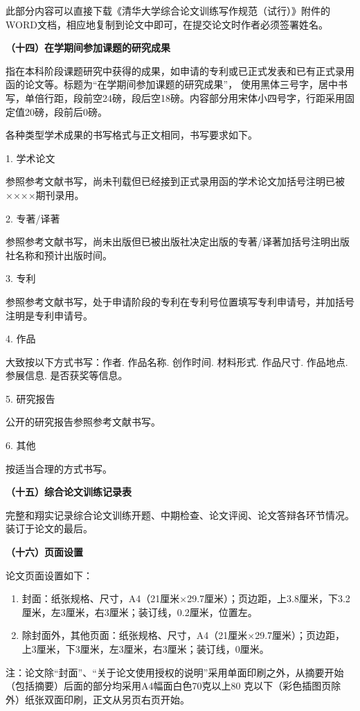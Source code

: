 \documentclass{Diploma}
\begin{document}
\begin{}
此部分内容可以直接下载《清华大学综合论文训练写作规范（试行）》附件的WORD文档，相应地复制到论文中即可，在提交论文时作者必须签署姓名。

\noindent\textbf{（十四）在学期间参加课题的研究成果}

指在本科阶段课题研究中获得的成果，如申请的专利或已正式发表和已有正式录用函的论文等。标题为“在学期间参加课题的研究成果”， 使用黑体三号字，居中书写，单倍行距，段前空24磅，段后空18磅。内容部分用宋体小四号字，行距采用固定值20磅，段前后0磅。

各种类型学术成果的书写格式与正文相同，书写要求如下。

1. 学术论文

参照参考文献书写，尚未刊载但已经接到正式录用函的学术论文加括号注明已被××××期刊录用。

2. 专著/译著

参照参考文献书写，尚未出版但已被出版社决定出版的专著/译著加括号注明出版社名称和预计出版时间。

3. 专利

参照参考文献书写，处于申请阶段的专利在专利号位置填写专利申请号，并加括号注明是专利申请号。

4. 作品

大致按以下方式书写：作者. 作品名称. 创作时间. 材料形式. 作品尺寸. 作品地点. 参展信息. 是否获奖等信息。

5. 研究报告

公开的研究报告参照参考文献书写。

6. 其他

按适当合理的方式书写。

\noindent\textbf{（十五）综合论文训练记录表}

完整和翔实记录综合论文训练开题、中期检查、论文评阅、论文答辩各环节情况。装订于论文的最后。

\noindent\textbf{（十六）页面设置}

论文页面设置如下：
\begin{enumerate}
  \item 封面：纸张规格、尺寸，A4（21厘米×29.7厘米）；页边距，上3.8厘米，下3.2厘米，左3厘米，右3厘米；装订线，0.2厘米，位置左。
  \item 除封面外，其他页面：纸张规格、尺寸，A4（21厘米×29.7厘米）；页边距，上3厘米，下3厘米，左3厘米，右3厘米；装订线，0厘米。
\end{enumerate}
注：论文除“封面”、“关于论文使用授权的说明”采用单面印刷之外，从摘要开始（包括摘要）后面的部分均采用A4幅面白色70克以上80 克以下（彩色插图页除外）纸张双面印刷，正文从另页右页开始。


\end{}
\end{document}
